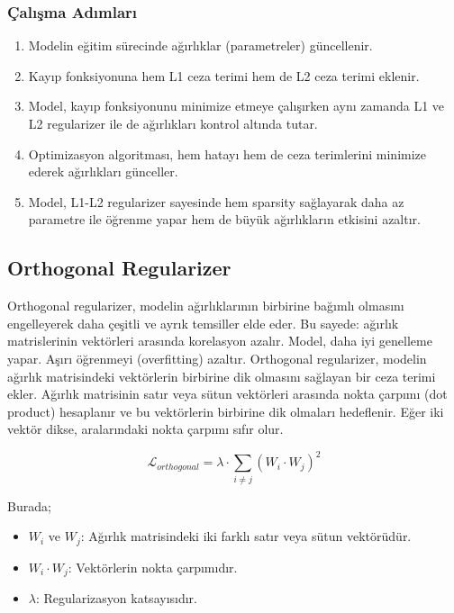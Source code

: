 \subsubsection{Çalışma Adımları}

\begin{enumerate}
    \item Modelin eğitim sürecinde ağırlıklar (parametreler) güncellenir.
    \item Kayıp fonksiyonuna hem L1 ceza terimi hem de L2 ceza terimi eklenir.
    \item Model, kayıp fonksiyonunu minimize etmeye çalışırken aynı zamanda L1 ve L2 regularizer ile de ağırlıkları kontrol altında tutar.
    \item Optimizasyon algoritması, hem hatayı hem de ceza terimlerini minimize ederek ağırlıkları günceller.
    \item Model, L1-L2 regularizer sayesinde hem sparsity sağlayarak daha az parametre ile öğrenme yapar hem de büyük ağırlıkların etkisini azaltır.
\end{enumerate}

\newpage

\subsection{Orthogonal Regularizer}

Orthogonal regularizer, modelin ağırlıklarının birbirine bağımlı olmasını engelleyerek daha çeşitli ve ayrık temsiller elde eder. Bu sayede: ağırlık matrislerinin vektörleri arasında korelasyon azalır. Model, daha iyi genelleme yapar. Aşırı öğrenmeyi (overfitting) azaltır. Orthogonal regularizer, modelin ağırlık matrisindeki vektörlerin birbirine dik olmasını sağlayan bir ceza terimi ekler. Ağırlık matrisinin satır veya sütun vektörleri arasında nokta çarpımı (dot product) hesaplanır ve bu vektörlerin birbirine dik olmaları hedeflenir. Eğer iki vektör dikse, aralarındaki nokta çarpımı sıfır olur. 

\[ \mathcal{L}_{orthogonal} = \lambda \cdot \sum_{i \neq j} \left( W_i \cdot W_j \right)^2 \]

Burada;

\begin{itemize}
    \item $W_i$ ve $W_j$: Ağırlık matrisindeki iki farklı satır veya sütun vektörüdür.
    \item $W_i \cdot W_j$: Vektörlerin nokta çarpımıdır.
    \item $\lambda$: Regularizasyon katsayısıdır.
\end{itemize}

